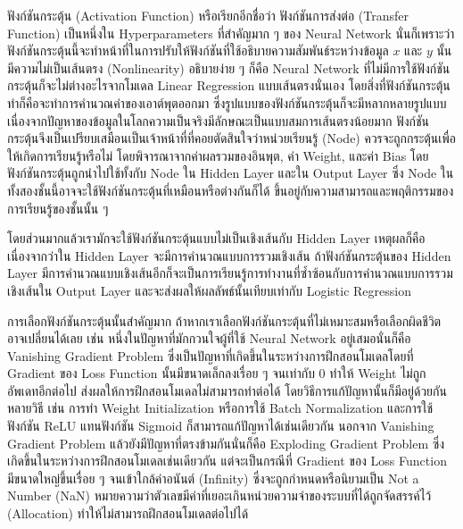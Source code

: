 ฟังก์ชันกระตุ้น (Activation Function) หรือเรียกอีกชื่อว่า ฟังก์ชันการส่งต่อ (Transfer Function) เป็นหนึ่งใน Hyperparameters ที่สำคัญมาก ๆ ของ Neural Network นั่นก็เพราะว่าฟังก์ชันกระตุ้นนี้จะทำหน้าที่ในการปรับให้ฟังก์ชันที่ใช้อธิบายความสัมพันธ์ระหว่างข้อมูล $x$ และ $y$ นั้นมีความไม่เป็นเส้นตรง (Nonlinearity) อธิบายง่าย ๆ ก็คือ Neural Network ที่ไม่มีการใช้ฟังก์ชันกระตุ้นก็จะไม่ต่างอะไรจากโมเดล Linear Regression แบบเส้นตรงนั่นเอง โดยสิ่งที่ฟังก์ชันกระตุ้นทำก็คือจะทำการคำนวณค่าของเอาต์พุตออกมา ซึ่งรูปแบบของฟังก์ชันกระตุ้นก็จะมีหลากหลายรูปแบบ เนื่องจากปัญหาของข้อมูลในโลกความเป็นจริงมีลักษณะเป็นแบบสมการเส้นตรงน้อยมาก ฟังก์ชันกระตุ้นจึงเป็นเปรียบเสมือนเป็นเจ้าหน้าที่ที่คอยตัดสินใจว่าหน่วยเรียนรู้ (Node) ควรจะถูกกระตุ้นเพื่อให้เกิดการเรียนรู้หรือไม่ โดยพิจารณาจากค่าผลรวมของอินพุต, ค่า Weight, และค่า Bias โดยฟังก์ชันกระตุ้นถูกนำไปใช้ทั้งกับ Node ใน Hidden Layer และใน Output Layer ซึ่ง Node ในทั้งสองชั้นนี้อาจจะใช้ฟังก์ชันกระตุ้นที่เหมือนหรือต่างกันก็ได้ ขึ้นอยู่กับความสามารถและพฤติกรรมของการเรียนรู้ของชั้นนั้น ๆ

โดยส่วนมากแล้วเรามักจะใช้ฟังก์ชันกระตุ้นแบบไม่เป็นเชิงเส้นกับ Hidden Layer เหตุผลก็คือเนื่องจากว่าใน Hidden Layer จะมีการคำนวณแบบการรวมเชิงเส้น ถ้าฟังก์ชันกระตุ้นของ Hidden Layer มีการคำนวณแบบเชิงเส้นอีกก็จะเป็นการเรียนรู้การทำงานที่ซ้ำซ้อนกับการคำนวณแบบการรวมเชิงเส้นใน Output Layer และจะส่งผลให้ผลลัพธ์นั้นเทียบเท่ากับ Logistic Regression

การเลือกฟังก์ชันกระตุ้นนั้นสำคัญมาก ถ้าหากเราเลือกฟังก์ชันกระตุ้นที่ไม่เหมาะสมหรือเลือกผิดชีวิตอาจเปลี่ยนได้เลย เช่น หนึ่งในปัญหาที่มักกวนใจผู้ที่ใช้ Neural Network อยู่เสมอนั่นก็คือ Vanishing Gradient Problem ซึ่งเป็นปัญหาที่เกิดขึ้นในระหว่างการฝึกสอนโมเดลโดยที่ Gradient ของ Loss Function นั้นมีขนาดเล็กลงเรื่อย ๆ จนเท่ากับ 0 ทำให้ Weight ไม่ถูกอัพเดทอีกต่อไป ส่งผลให้การฝึกสอนโมเดลไม่สามารถทำต่อได้ โดยวิธีการแก้ปัญหานั้นก็มีอยู่ด้วยกันหลายวิธี เช่น การทำ Weight Initialization หรือการใช้ Batch Normalization และการใช้ฟังก์ชัน ReLU แทนฟังก์ชัน Sigmoid ก็สามารถแก้ปัญหาได้เช่นเดียวกัน นอกจาก Vanishing Gradient Problem แล้วยังมีปัญหาที่ตรงข้ามกันนั่นก็คือ Exploding Gradient Problem ซึ่งเกิดขึ้นในระหว่างการฝึกสอนโมเดลเช่นเดียวกัน แต่จะเป็นกรณีที่ Gradient ของ Loss Function มีขนาดใหญ่ขึ้นเรื่อย ๆ จนเข้าใกล้ค่าอนันต์ (Infinity) ซึ่งจะถูกกำหนดหรือนิยามเป็น Not a Number (NaN) หมายความว่าตัวเลขมีค่าที่เยอะเกินหน่วยความจำของระบบที่ได้ถูกจัดสรรค์ไว้ (Allocation) ทำให้ไม่สามารถฝึกสอนโมเดลต่อไปได้

